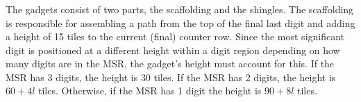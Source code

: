 \subsubsection{\roofunit}
%
The {\roofunit} gadgets consist of two parts, the scaffolding and the shingles.
%
The scaffolding is responsible for assembling a path from the top of the final last digit and adding a height of 15 tiles to the current (final) counter row.
%
Since the most significant digit is positioned at a different height within a digit region depending on how many digits
are in the MSR, the {\roofscaffolding} gadget's height must account for this.
%
If the MSR has 3 digits, the height is $30$ tiles.
%
If the MSR has 2 digits, the height is $60 + 4l$ tiles.
%
Otherwise, if the MSR has 1 digit the height is $90 + 8l$ tiles.
%




